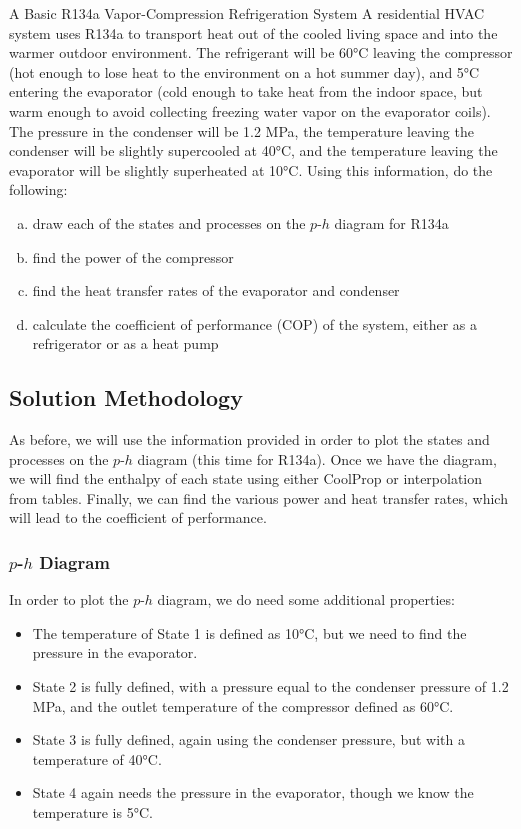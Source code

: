 \begin{example}[label=ex:ch4_refrigeration]{A Basic R134a Vapor-Compression Refrigeration System}
  A residential HVAC system uses R134a to transport heat out of the cooled living space and into the warmer outdoor environment.  The refrigerant will be 60°C leaving the compressor (hot enough to lose heat to the environment on a hot summer day), and 5°C entering the evaporator (cold enough to take heat from the indoor space, but warm enough to avoid collecting freezing water vapor on the evaporator coils).
  The pressure in the condenser will be 1.2 MPa, the temperature leaving the condenser will be slightly supercooled at 40°C, and the temperature leaving the evaporator will be slightly superheated at 10°C.
  Using this information, do the following:
  \begin{enumerate}[a)]
    
  \item draw each of the states and processes on the $p$-$h$ diagram for R134a

  \item find the power of the compressor

  \item find the heat transfer rates of the evaporator and condenser

  \item calculate the coefficient of performance (COP) of the system, either as a refrigerator or as a heat pump
  \end{enumerate}

  \subsection*{Solution Methodology}
  As before, we will use the information provided in order to plot the states and processes on the $p$-$h$ diagram (this time for R134a).  Once we have the diagram, we will find the enthalpy of each state using either CoolProp or interpolation from tables.  Finally, we can find the various power and heat transfer rates, which will lead to the coefficient of performance.

  \subsubsection*{$p$-$h$ Diagram}

  In order to plot the $p$-$h$ diagram, we do need some additional properties:
  \begin{itemize}
  \item The temperature of State 1 is defined as 10°C, but we need to find the pressure in the evaporator.
  \item State 2 is fully defined, with a pressure equal to the condenser pressure of 1.2 MPa, and the outlet temperature of the compressor defined as 60°C.
  \item State 3 is fully defined, again using the condenser pressure, but with a temperature of 40°C.
  \item State 4 again needs the pressure in the evaporator, though we know the temperature is 5°C.
  \end{itemize}


\end{example}
